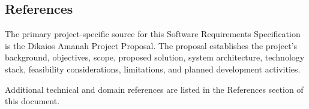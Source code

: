 \subsection{References}

The primary project-specific source for this Software Requirements
Specification is the Dikaios Amanah Project Proposal. The proposal
establishes the project's background, objectives, scope, proposed solution,
system architecture, technology stack, feasibility considerations,
limitations, and planned development activities.

Additional technical and domain references are listed in the References
section of this document.
